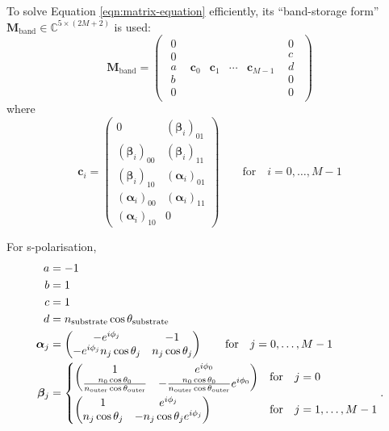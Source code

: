 \documentclass[]{article}
\begin{document}
	To solve Equation \ref{eqn:matrix-equation} efficiently, its ``band-storage form'' $\mathbf{M}_\text{band}\in \mathbb{C}^{5\times(2M+2)}$ is used:
	\begin{equation}
		\mathbf{M}_\text{band}=
		\begin{pmatrix}
			\begin{matrix}0\\0\\a\\b\\0\end{matrix}&\bm{c}_0&\bm{c}_1&\cdots&\bm{c}_{M-1}&\begin{matrix}0\\c\\d\\0\\0\end{matrix}
		\end{pmatrix}
	\end{equation}
	where
	\begin{equation}
		\bm{c}_i=
		\begin{pmatrix}
			0&(\bm{\beta}_i)_{01}\\
			(\bm{\beta}_i)_{00}&(\bm{\beta}_i)_{11}\\
			(\bm{\beta}_i)_{10}&(\bm{\alpha}_{i})_{01}\\
			(\bm{\alpha}_{i})_{00}&(\bm{\alpha}_{i})_{11}\\
			(\bm{\alpha}_{i})_{10}&0
		\end{pmatrix}\quad\quad\text{for}\quad i=0,\dots,M-1
	\end{equation}

	For s-polarisation,
	\begin{align}
		a&=-1\\
		b&=1\\
		c&=1\\
		d&=n_\text{substrate}\cos\theta_\text{substrate}\\
		\bm{\alpha}_j&=
		\begin{pmatrix}
			-e^{i\phi_{j}}&-1\\
			-e^{i\phi_{j}}n_{j}\cos\theta_{j}&n_{j}\cos\theta_{j}
		\end{pmatrix}\quad\quad\text{for}\quad j=0,\dots,M-1\\
		\bm{\beta}_j&=
		\begin{dcases}
			\begin{pmatrix}
				1&e^{i\phi_0}\\
				\frac{n_0\cos\theta_0}{n_\text{outer}\cos\theta_\text{outer}}&-\frac{n_0\cos\theta_0}{n_\text{outer}\cos\theta_\text{outer}}e^{i\phi_0}
			\end{pmatrix}&\text{for}\quad j=0\\
			\begin{pmatrix}
				1&e^{i\phi_j}\\
				n_j\cos\theta_j&-n_j\cos\theta_je^{i\phi_j}
			\end{pmatrix}&\text{for}\quad j=1,\dots,M-1
		\end{dcases}.
	\end{align}
\end{document}
